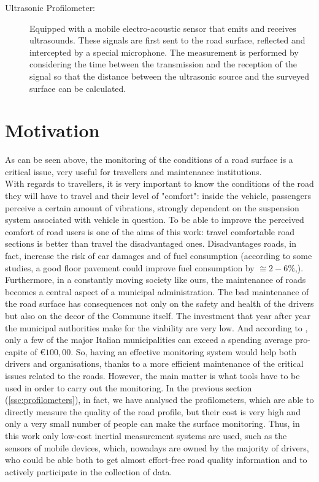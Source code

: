 \documentclass[tesi]{subfiles}
\begin{document}
\begin{enumerate}
\begin{description}
\item [Ultrasonic Profilometer:] Equipped with a mobile electro-acoustic sensor that emits and receives ultrasounds. These signals are first sent to the road surface, reflected and intercepted by a special microphone. The measurement is performed by considering the time between the transmission and the reception of the signal so that the distance between the ultrasonic source and the surveyed surface can be calculated\cite{little_book}.
\end{description}

\end{enumerate}

	\section{Motivation}\label{sc:Motivation}
As can be seen above, the monitoring of the conditions of a road surface is a critical issue, very useful for travellers and maintenance institutions.\\
With regards to travellers, it is very important to know the conditions of the road they will have to travel and their level of "comfort": inside the vehicle, passengers perceive a certain amount of vibrations, strongly dependent on the suspension system associated with vehicle in question.
To be able to improve the perceived comfort of road users is one of the aims of this work: travel comfortable road sections is better than travel the disadvantaged ones. Disadvantages roads, in fact, increase the risk of car damages and of fuel consumption (according to some studies, a good floor pavement could improve fuel consumption by $\displaystyle{\cong{2-6\%}}$\cite{jackson2011synthesis},\cite{jointeapa}).
Furthermore, in a constantly moving society like ours, the maintenance of roads becomes a central aspect of a municipal administration. The bad maintenance of the road surface has consequences not only on the safety and health of the drivers but also on the decor of the Commune itself. 
The investment that year after year the municipal authorities make for the viability are very low. And according to \cite{piemonte2013finanza}, only a few of the major Italian municipalities can exceed a spending average pro-capite of $\displaystyle{\euro 100,00}$.
So, having an effective monitoring system would help both drivers and organisations, thanks to a more efficient maintenance of the critical issues related to the roads.
However, the main matter is what tools have to be used in order to carry out the monitoring. In the previous section (\ref{ssc:profilometers}), in fact, we have analysed the profilometers, which are able to directly measure the quality of the road profile, but their cost is very high and only a very small number of people can make the surface monitoring. 
Thus, in this work only low-cost inertial measurement systems are used, such as the sensors of mobile devices, which, nowadays are owned by the majority of drivers, who could be able both to get almost effort-free road quality information and to actively participate in the collection of data.
\end{document}
